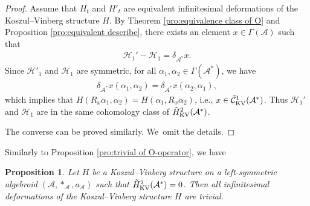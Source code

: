 \documentclass[10pt,a4paper]{amsart}
\numberwithin{equation}{section}
\newtheorem{pro}[thm]{Proposition}
\newcommand{\huaA}{\mathcal{A}}
\newcommand{\huaC}{\mathcal{C}}
\newcommand{\huaH}{\mathcal{H}}
\begin{document}
\begin{proof}
Assume that $H_t$ and $H'_t$ are equivalent infinitesimal deformations of the Koszul--Vinberg structure $H$. By Theorem \ref{pro:equivalence class of O} and Proposition \ref{pro:equivalent describe}, there exists an element $x\in\Gamma(\huaA)$ such that\vspace{-.5ex}
\begin{gather*}
\huaH_1'- \huaH_1=\delta_{\huaA^* }x.
\end{gather*}
Since $\huaH'_1$ and $\huaH_1$ are symmetric, for all $\alpha_1,\alpha_2\in \Gamma(\huaA^*)$, we have\vspace{-.5ex}
\begin{gather*}
\delta_{\huaA^* }x(\alpha_1,\alpha_2)=\delta_{\huaA^* }x(\alpha_2,\alpha_1),
\end{gather*}
which implies that $H(R_x \alpha_1,\alpha_2)=H(\alpha_1,R_x\alpha_2)$, i.e., $x\in 	\tilde{\huaC}_{\rm KV}^1(\huaA^*)$. Thus $\huaH_1'$ and $\huaH_1$ are in the same cohomology class of $\tilde{H}_{\rm KV}^2(\huaA^*)$.

The converse can be proved similarly. We~omit the details.\vspace{-.5ex}
\end{proof}

Similarly to Proposition \ref{pro:trivial of O-operator}, we have\vspace{-.5ex}
{\sloppy\begin{pro}
Let $H$ be a Koszul--Vinberg structure on a left-symmetric algebroid $(\huaA,\ast_\huaA,a_\huaA)$ such that $\tilde{H}_{\rm KV}^2(\huaA^*)=0$. Then all infinitesimal deformations of the Koszul--Vinberg structure $H$ are trivial.
\end{pro}}
\end{document}
